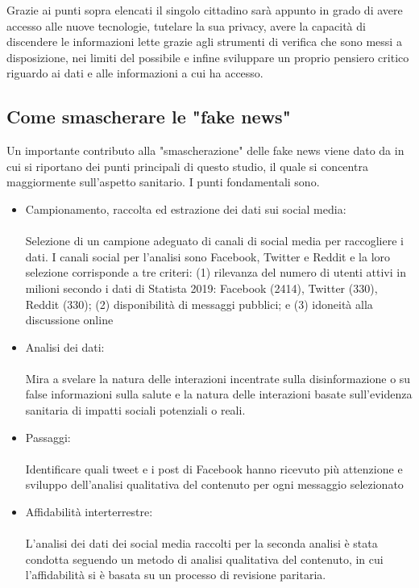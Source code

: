 \documentclass{article}
\begin{document}
\begin{itemize}
Grazie ai punti sopra elencati il singolo cittadino sarà appunto in grado di avere accesso alle nuove tecnologie, tutelare la sua privacy, avere la capacità di discendere le informazioni lette grazie agli strumenti di verifica che sono messi a disposizione, nei limiti del possibile e infine sviluppare un proprio pensiero critico riguardo ai dati e alle informazioni a cui ha accesso.
\end{itemize}
\subsection{Come smascherare le "fake news"}
Un importante contributo alla "smascherazione" delle fake news viene dato da \cite{pulido2020new} in cui si riportano dei punti principali di questo studio, il quale si concentra maggiormente sull'aspetto sanitario.
I punti fondamentali sono.
\begin{itemize}
    \item Campionamento, raccolta ed estrazione dei dati sui social media: \\
    \\
     Selezione di un campione adeguato di canali di social media per raccogliere i dati. I canali social per l'analisi sono Facebook, Twitter e Reddit e la loro selezione corrisponde a tre criteri: (1) rilevanza del numero di utenti attivi in milioni secondo i dati di Statista 2019: Facebook (2414), Twitter (330), Reddit (330); (2) disponibilità di messaggi pubblici; e (3) idoneità alla discussione online
    \item Analisi dei dati: \\
    \\
    Mira a svelare la natura delle interazioni incentrate sulla disinformazione o su false informazioni sulla salute e la natura delle interazioni basate sull'evidenza sanitaria di impatti sociali potenziali o reali. 
    \item Passaggi: \\
    \\
     Identificare quali tweet e i post di Facebook hanno ricevuto più attenzione e sviluppo dell'analisi qualitativa del contenuto per ogni messaggio selezionato 
    \item Affidabilità interterrestre: \\
    \\
    L'analisi dei dati dei social media raccolti per la seconda analisi è stata condotta seguendo un metodo di analisi qualitativa del contenuto, in cui l'affidabilità si è basata su un processo di revisione paritaria.
\end{itemize}
\end{document}

